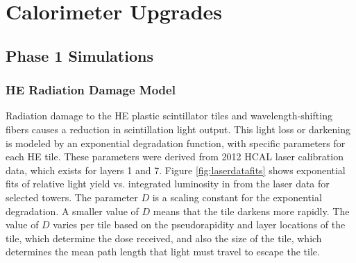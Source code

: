 \chapter{Calorimeter Upgrades
\label{ch:upgrades}}

\section{Phase 1 Simulations}

\subsection{HE Radiation Damage Model}

Radiation damage to the HE plastic scintillator tiles and wavelength-shifting fibers causes a reduction in scintillation light output.
This light loss or darkening is modeled by an exponential degradation function, with specific parameters for each HE tile.
These parameters were derived from 2012 HCAL laser calibration data, which exists for layers 1 and 7.
Figure \ref{fig:laserdatafits} shows exponential fits of relative light yield vs. integrated luminosity in \fbinv from the laser data for selected towers.
The parameter $D$ is a scaling constant for the exponential degradation. A smaller value of $D$ means that the tile darkens more rapidly.
The value of $D$ varies per tile based on the pseudorapidity and layer locations of the tile, which determine the dose received, and also the size of the tile, which determines the mean path length that light must travel to escape the tile.

